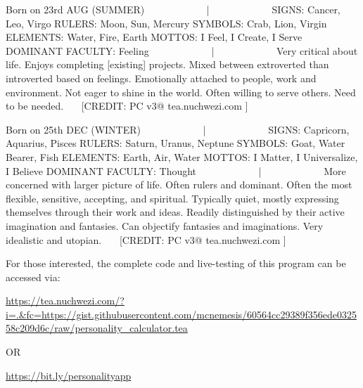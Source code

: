 \documentclass[a4paper, 18pt]{book} %
\begin{document}
{{{   \begin{tcbverbatim}[title=Sample PC OUTPUT]
Born on 23rd AUG (SUMMER)
~~~~~~~~~~~~|~~~~~~~~~~~~
SIGNS: Cancer, Leo, Virgo
RULERS: Moon, Sun, Mercury
SYMBOLS: Crab, Lion, Virgin
ELEMENTS: Water, Fire, Earth
MOTTOS: I Feel, I Create, I Serve
DOMINANT FACULTY: Feeling
~~~~~~~~~~~~|~~~~~~~~~~~~
Very critical about life. Enjoys completing [existing] projects. Mixed between extroverted than introverted based on feelings. Emotionally attached to people, work and environment. Not eager to shine in the world. Often willing to serve others. Need to be needed.
~~~[CREDIT: PC v3@ tea.nuchwezi.com ]~~~
  \end{tcbverbatim}
 

\vspace{2em}

 
  
   \begin{tcbverbatim}[title=Sample PC OUTPUT]
Born on 25th DEC (WINTER)
~~~~~~~~~~~~|~~~~~~~~~~~~
SIGNS: Capricorn, Aquarius, Pisces
RULERS: Saturn, Uranus, Neptune
SYMBOLS: Goat, Water Bearer, Fish
ELEMENTS: Earth, Air, Water
MOTTOS: I Matter, I Universalize, I Believe
DOMINANT FACULTY: Thought
~~~~~~~~~~~~|~~~~~~~~~~~~
More concerned with larger picture of life. Often rulers and dominant. Often the most flexible, sensitive, accepting, and spiritual. Typically quiet, mostly expressing themselves through their work and ideas. Readily distinguished by their active imagination and fantasies. Can objectify fantasies and imaginations. Very idealistic and utopian.
~~~[CREDIT: PC v3@ tea.nuchwezi.com ]~~~
  \end{tcbverbatim}
 

\vspace{2em}


For those interested, the complete code and live-testing of this program can be accessed via:


 
\vspace{1em}

 \url{https://tea.nuchwezi.com/?i=.&fc=https://gist.githubusercontent.com/mcnemesis/60564cc29389f356ede032558c209d6c/raw/personality_calculator.tea}

\vspace{1em} 

OR

\vspace{1em} 

 \url{https://bit.ly/personalityapp}
 
}}}
\end{document}
